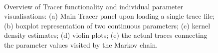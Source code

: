 \documentclass{bioinfo}
\begin{document}
\begin{figure}[ht]
\\
\caption{Overview of Tracer functionality and individual parameter visualisations: (a) Main Tracer panel upon loading a single trace file; (b) boxplot representation of two continuous parameters; (c) kernel density estimates; (d) violin plots; (e) the actual traces connecting the parameter values visited by the Markov chain.}
\label{fig:overview}
\end{figure}
\end{document}
